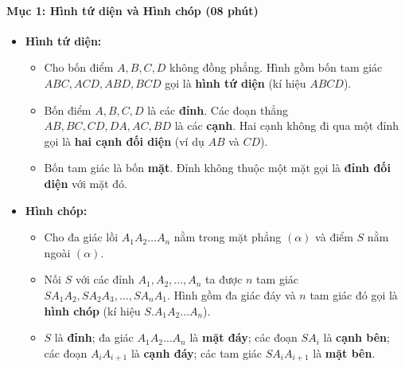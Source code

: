 \documentclass[12pt, a4paper]{article}
\begin{document}
\paragraph{Mục 1: Hình tứ diện và Hình chóp (08 phút)}
\begin{itemize}
    \item \textbf{Hình tứ diện:}
    \begin{itemize}
        \item Cho bốn điểm $A, B, C, D$ không đồng phẳng. Hình gồm bốn tam giác $ABC, ACD, ABD, BCD$ gọi là \textbf{hình tứ diện} (kí hiệu $ABCD$).
        \item Bốn điểm $A, B, C, D$ là các \textbf{đỉnh}. Các đoạn thẳng $AB, BC, CD, DA, AC, BD$ là các \textbf{cạnh}. Hai cạnh không đi qua một đỉnh gọi là \textbf{hai cạnh đối diện} (ví dụ $AB$ và $CD$).
        \item Bốn tam giác là bốn \textbf{mặt}. Đỉnh không thuộc một mặt gọi là \textbf{đỉnh đối diện} với mặt đó.
    \end{itemize}
    \item \textbf{Hình chóp:}
    \begin{itemize}
        \item Cho đa giác lồi $A_1A_2\dots A_n$ nằm trong mặt phẳng $(\alpha)$ và điểm $S$ nằm ngoài $(\alpha)$.
        \item Nối $S$ với các đỉnh $A_1, A_2, \dots, A_n$ ta được $n$ tam giác $SA_1A_2, SA_2A_3, \dots, SA_nA_1$. Hình gồm đa giác đáy và $n$ tam giác đó gọi là \textbf{hình chóp} (kí hiệu $S.A_1A_2\dots A_n$).
        \item $S$ là \textbf{đỉnh}; đa giác $A_1A_2\dots A_n$ là \textbf{mặt đáy}; các đoạn $SA_i$ là \textbf{cạnh bên}; các đoạn $A_iA_{i+1}$ là \textbf{cạnh đáy}; các tam giác $SA_iA_{i+1}$ là \textbf{mặt bên}.
    \end{itemize}
\end{itemize}
\end{document}
